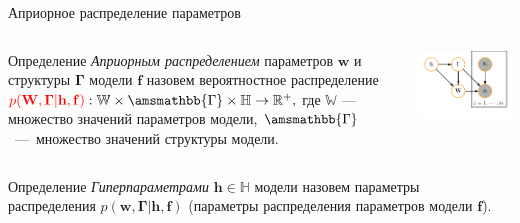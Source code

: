 \documentclass[usenames,dvipsnames,11pt,pdf,utf8,russian,aspectratio=43]{beamer}
\begin{document}
\begin{frame}{Априорное распределение параметров}
\footnotesize   
\begin{columns}
\begin{column}{0.6\textwidth}
   \begin{block}{Определение}
\textit{Априорным распределением} параметров $\mathbf{w}$ и структуры  $\boldsymbol{\Gamma}$ модели $\mathbf{f}$ назовем вероятностное распределение
$
    \textcolor{red}{p(\mathbf{W}, \boldsymbol{\Gamma}|\mathbf{h},\mathbf{f})}: \mathbb{W} \times \amsmathbb{\Gamma} \times \mathbb{H} \to \mathbb{R}^{+}, 
$
где $\mathbb{W}$ --- множество значений параметров модели, $\amsmathbb{\Gamma}$~---~множество значений структуры модели.
\end{block}

\end{column}
\begin{column}{0.4\textwidth}  %
    \begin{center}
     \includegraphics[width=\textwidth]{simple_plate.pdf}
     \end{center}
\end{column}
\end{columns}
\vspace*{-0.5cm}
\begin{block}{Определение}
\textit{Гиперпараметрами} $\mathbf{h}\in \mathbb{H}$ модели  назовем параметры распределения $p(\mathbf{w}, \boldsymbol{\Gamma}|\mathbf{h},\mathbf{f})$ (параметры распределения параметров модели $\mathbf{f}$).
 

\end{block}
\end{frame}
\end{document}
